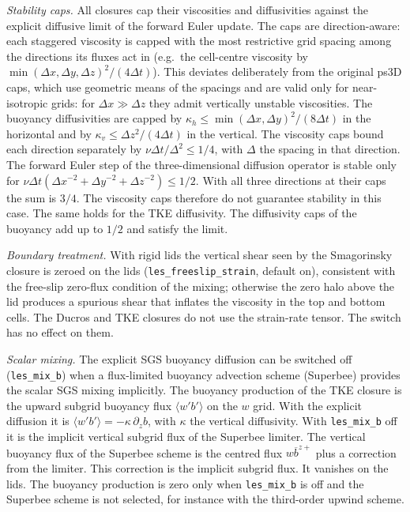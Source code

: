 \documentclass[12pt]{article}
\newcommand{\pz}[1]{{\partial_z #1}}
\newcommand{\lk}{\left(}
\newcommand{\rk}{\right)}
\newcommand{\Bar}[1]{ \overline{ #1} }
\begin{document}
\emph{Stability caps.} All closures cap their viscosities and
diffusivities against the explicit diffusive limit of the forward Euler
update. The caps are direction-aware: each staggered viscosity is capped
with the most restrictive grid spacing among the directions its fluxes
act in (e.g.\ the cell-centre viscosity by $\min(\Delta x, \Delta y,
\Delta z)^2/(4\Delta t)$). This deviates deliberately from the original
ps3D caps, which use geometric means of the spacings and are valid only
for near-isotropic grids: for $\Delta x \gg \Delta z$ they admit
vertically unstable viscosities.
The buoyancy diffusivities are capped by
$\kappa_h \le \min(\Delta x, \Delta y)^2/(8\Delta t)$ in the horizontal
and by $\kappa_v \le \Delta z^2/(4\Delta t)$ in the vertical.
The viscosity caps bound each direction separately by
$\nu \Delta t/\Delta^2 \le 1/4$, with $\Delta$ the spacing in that
direction. The forward Euler step of the three-dimensional diffusion
operator is stable only for
$\nu \Delta t \lk \Delta x^{-2} + \Delta y^{-2} + \Delta z^{-2} \rk \le 1/2$.
With all three directions at their caps the sum is $3/4$. The viscosity
caps therefore do not guarantee stability in this case. The same holds
for the TKE diffusivity. The diffusivity caps of the buoyancy add up to
$1/2$ and satisfy the limit.

\emph{Boundary treatment.} With rigid lids the vertical shear seen by the
Smagorinsky closure is zeroed on the lids (\verb|les_freeslip_strain|, default on),
consistent with the free-slip zero-flux condition of the mixing;
otherwise the zero halo above the lid produces a spurious shear that
inflates the viscosity in the top and bottom cells. The Ducros and TKE
closures do not use the strain-rate tensor. The switch has no effect on
them.

\emph{Scalar mixing.} The explicit SGS buoyancy diffusion can be switched
off (\verb|les_mix_b|) when a flux-limited buoyancy advection scheme
(Superbee) provides the scalar SGS mixing implicitly. The buoyancy
production of the TKE closure is the upward subgrid buoyancy flux
$\langle w' b' \rangle$ on the $w$ grid. With the explicit diffusion it is
$\langle w' b' \rangle = -\kappa\, \pz b$, with $\kappa$ the vertical
diffusivity. With \verb|les_mix_b| off it is the implicit vertical
subgrid flux of the Superbee limiter. The vertical buoyancy flux of the
Superbee scheme is the centred flux $w \Bar b^{z+}$ plus a correction
from the limiter. This correction is the implicit subgrid flux. It
vanishes on the lids. The buoyancy production is zero only when
\verb|les_mix_b| is off and the Superbee scheme is not selected, for
instance with the third-order upwind scheme.
\end{document}
